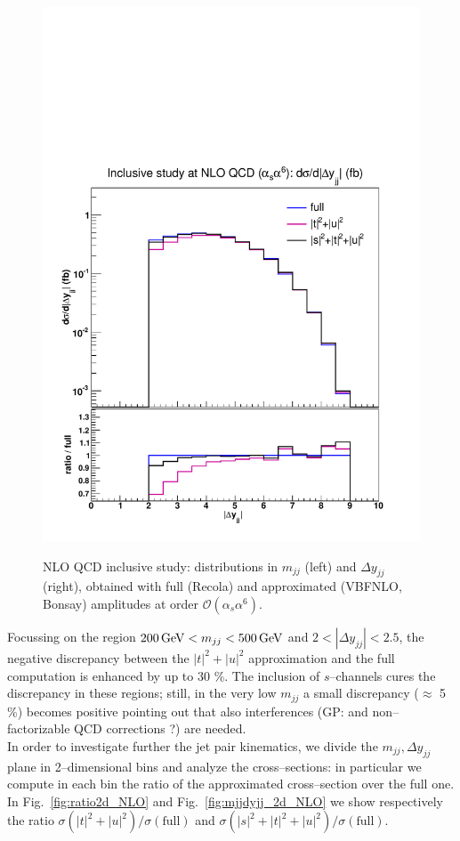 \begin{figure}[hbt]
{\includegraphics[scale=0.35]{figures/scanfigures/dyjj_nlo.pdf}}
\caption{NLO QCD inclusive study: distributions in $m_{jj}$ (left) and $\Delta y_{jj}$ (right), obtained with full ({\sc Recola}) and approximated ({\sc VBFNLO, Bonsay}) amplitudes at order $\mathcal{O}(\alpha_s\alpha^6)$.} \label{fig:mjjdyjj_1d_1}
\end{figure}
Focussing on the region  $200 \,\text{GeV} < m_{jj} < 500 \,\text{GeV}$ and $2<|\Delta y_{jj}|<2.5$, the negative discrepancy between the $|t|^2 + |u|^2$ approximation and the full computation is enhanced by up to 30 \%. The inclusion of $s$--channels cures the discrepancy in these regions; still, in the very low $m_{jj}$ a small discrepancy ($\approx$ 5 \%) becomes positive pointing out that also interferences (GP: and non--factorizable QCD corrections ?) are needed.\\
In order to investigate further the jet pair kinematics, we divide the $m_{jj},\Delta y_{jj}$ plane in 2--dimensional bins and analyze the cross--sections: in particular we compute in each bin the ratio of the approximated cross--section over the full one. In Fig.~\ref{fig:ratio2d_NLO} and Fig.~\ref{fig:mjjdyjj_2d_NLO} we show respectively the ratio $\sigma(|t|^2 + |u|^2)/\sigma(\textrm{full})$ and $\sigma(|s|^2+|t|^2 + |u|^2)/\sigma(\textrm{full})$.
